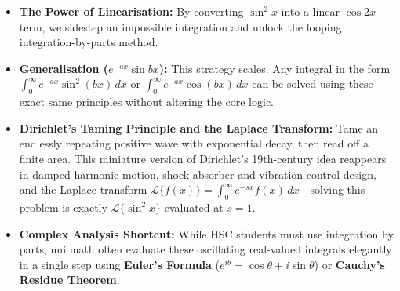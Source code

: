 \begin{takeaways}
\begin{itemize}
    \item \textbf{The Power of Linearisation:} By converting $\sin^2 x$ into a linear $\cos 2x$ term, we sidestep an impossible integration and unlock the looping integration-by-parts method.
    \item \textbf{Generalisation ($e^{-ax} \sin bx$):} This strategy scales. Any integral in the form $\int_0^\infty e^{-ax} \sin^2(bx) \, dx$ or $\int_0^\infty e^{-ax} \cos(bx) \, dx$ can be solved using these exact same principles without altering the core logic.
    \item \textbf{Dirichlet's Taming Principle and the Laplace Transform:} Tame an endlessly repeating positive wave with exponential decay, then read off a finite area. This miniature version of Dirichlet's 19th-century idea reappears in damped harmonic motion, shock-absorber and vibration-control design, and the Laplace transform $\mathcal{L}\{f(x)\} = \int_0^\infty e^{-sx} f(x) \, dx$---solving this problem is exactly $\mathcal{L}\{\sin^2 x\}$ evaluated at $s=1$.
    \item \textbf{Complex Analysis Shortcut:} While HSC students must use integration by parts, uni math often evaluate these oscillating real-valued integrals elegantly in a single step using \textbf{Euler's Formula} ($e^{i\theta} = \cos \theta + i\sin \theta$) or \textbf{Cauchy's Residue Theorem}.
\end{itemize}
\end{takeaways}


